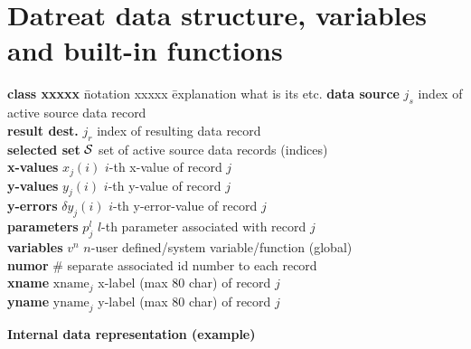 \documentclass[11pt,fleqn]{book} %
\newcommand{\cmdl}[2]{{\color{red}{\bf \underline{#1} #2}}}
\newcommand{\var}[1]{{\color{red} \bf \it #1}}
\begin{document}
\begin{corollary}
\cmdl{plot}{xmin \var{x1} xmax \var{x2}}
\end{corollary}

\section{Datreat data structure, variables and built-in functions}

\begin{tabbing}
\textbf{class xxxxx  }  \= notation xxxxx \= explanation what is its etc.                                 \kill
\textbf{data source  }  \> ${j_s}$    \> index of active source data record                     \\
\textbf{result dest. }  \> ${j_r}$    \> index of resulting data record                         \\
\textbf{selected set }  \> $\cal{S}$  \> set of active source data records (indices)            \\
\textbf{x-values     }  \> $x_j(i)$   \> $i$-th x-value of record $j$                           \\
\textbf{y-values     }  \> $y_j(i)$   \> $i$-th y-value of record $j$                           \\
\textbf{y-errors     }  \> $\delta y_j(i)$   \> $i$-th y-error-value of record $j$             \\
\textbf{parameters   }  \> $p^l_j $   \> $l$-th parameter associated with record $j$            \\
\textbf{variables    }  \> $v^n   $   \> $n$-user defined/system variable/function (global)     \\
\textbf{numor        }  \> $\#     $   \> separate associated id number to each record           \\
\textbf{xname        }  \> ${\text{xname}_j}$ \> x-label (max 80 char) of record $j$            \\
\textbf{yname        }  \> ${\text{yname}_j}$ \> y-label (max 80 char) of record $j$            \\
\end{tabbing}

\noindent
{\bf Internal data representation (example)}
\end{document}
